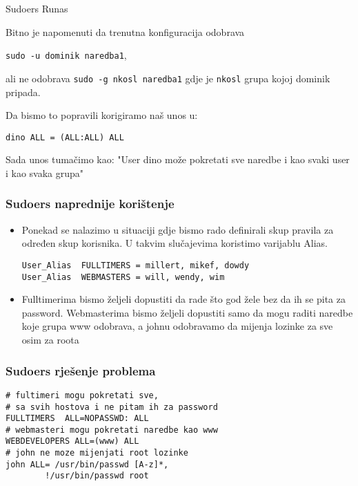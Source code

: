 \documentclass[table,usenames,dvipsnames] {beamer}
\newcommand{\shell}[1]{\texttt{#1}}
\begin{document}
\begin{frame} {Sudoers Runas}

Bitno je napomenuti da trenutna konfiguracija odobrava 

\shell{sudo -u dominik naredba1},

 ali ne odobrava \shell{sudo -g nkosl naredba1} gdje je \shell{nkosl} grupa kojoj dominik pripada.
 
Da bismo to popravili korigiramo naš unos u:

\shell{dino ALL = (ALL:ALL) ALL}

Sada unos tumačimo kao: "User dino može pokretati sve naredbe i kao svaki user i kao svaka grupa"
\end{frame}

\begin{frame}[fragile]
\frametitle{Sudoers naprednije korištenje}
\begin{itemize}
\item Ponekad se nalazimo u situaciji gdje bismo rado definirali skup pravila za određen skup korisnika. U takvim slučajevima koristimo varijablu Alias.
\begin{lstlisting}
User_Alias	FULLTIMERS = millert, mikef, dowdy
User_Alias	WEBMASTERS = will, wendy, wim
\end{lstlisting}

\item Fulltimerima bismo željeli dopustiti da rade što god žele bez da ih se pita za password. Webmasterima bismo željeli dopustiti samo da mogu raditi naredbe koje grupa www odobrava, a johnu odobravamo da mijenja lozinke za sve osim za roota
\end{itemize}
\end{frame}

\begin{frame}[fragile]
\frametitle{Sudoers rješenje problema}
\begin{lstlisting}
# fultimeri mogu pokretati sve, 
# sa svih hostova i ne pitam ih za password
FULLTIMERS	ALL=NOPASSWD: ALL
# webmasteri mogu pokretati naredbe kao www
WEBDEVELOPERS ALL=(www) ALL
# john ne moze mijenjati root lozinke
john ALL= /usr/bin/passwd [A-z]*, 
		!/usr/bin/passwd root
\end{lstlisting}
\end{frame}
\end{document}
